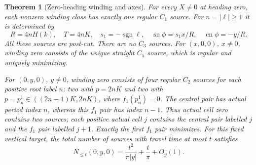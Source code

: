 \documentclass[11pt,a4paper]{article}
\newtheorem{theorem}{Theorem}[section]
\theoremstyle{remark}\newtheorem{remark}[theorem]{Remark}
\newcommand{\sn}{\operatorname{sn}}
\newcommand{\cn}{\operatorname{cn}}
\begin{document}
\begin{theorem}[Zero-heading winding and axes]\label{thm:zero-axes}
For every $X\ne0$ at heading zero, each nonzero winding class has exactly
one regular $C_1$ source. For $n=|\ell|\ge1$ it is determined by
\[
 R=4nH(k),\quad T=4nK,\quad s_1=-\operatorname{sgn}\ell,\quad
 \sn\phi=s_1x/R,\quad \cn\phi=-y/R .
\]
All these sources are post-cut. There are no $C_3$ sources.
For $(x,0,0)$, $x\ne0$, winding zero consists of the unique straight
$C_5$ source, which is regular and uniquely minimizing.

For $(0,y,0)$, $y\ne0$, winding zero consists of four regular $C_2$
sources for each positive root label $n$: two with $p=2nK$ and two with
$p=p_n^1\in((2n-1)K,2nK)$, where $f_1(p_n^1)=0$.
The central pair has actual period index $n$, whereas this $f_1$ pair
has index $n-1$. Thus actual cell zero contains two sources; each
positive actual cell $j$ contains the central pair labelled $j$ and
the $f_1$ pair labelled $j+1$.
Exactly the first $f_1$ pair minimizes. For this fixed vertical target,
the total number of sources with travel time at most $t$ satisfies
\begin{equation}\label{eq:zero-vertical-time}
 N_{\le t}(0,y,0)=\frac{t^2}{\pi|y|}+\frac t\pi+O_y(1).
\end{equation}
\end{theorem}
\end{document}
